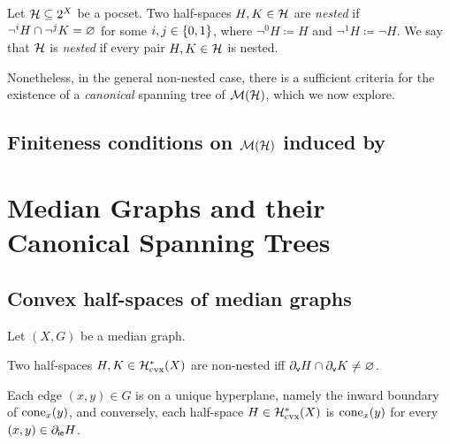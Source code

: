\documentclass{amsart}
\begin{document}
    \begin{definition}\label{def:nested}
        Let $\mc{H}\subseteq2^X$ be a pocset. Two half-spaces $H,K\in\mc{H}$ are \textit{nested} if $\lnot^iH\cap\lnot^jK=\em$ for some $i,j\in\l\{0,1\r\}$, where $\lnot^0H\coloneqq H$ and $\lnot^1H\coloneqq\lnot H$. We say that $\mc{H}$ is \textit{nested} if every pair $H,K\in\mc{H}$ is nested.
    \end{definition}

    Nonetheless, in the general non-nested case, there is a sufficient criteria for the existence of a \textit{canonical} spanning tree of $\mc{M}(\mc{H})$, which we now explore.

    \subsection{Finiteness conditions on $\mc{M}(\mc{H})$ induced by {\color{red}{???}}}\label{sec:finiteness_conditions_on_median_graph_dense_cuts}

    \section{Median Graphs and their Canonical Spanning Trees}\label{sec:spanning_trees_of_median_graphs_with_finite_hyperplanes}

    \subsection{Convex half-spaces of median graphs}

    Let $(X,G)$ be a median graph.

    \begin{lemma}\label{lem:non-nested_iff_boundary_intersect}
        Two half-spaces $H,K\in\mc{H}^\ast_\mathrm{cvx}(X)$ are non-nested iff $\del_\sf{v}H\cap\del_\sf{v}K\neq\em$.
    \end{lemma}

    \begin{lemma}\label{lem:half-spaces_are_cones}
        Each edge $(x,y)\in G$ is on a unique hyperplane, namely the inward boundary of $\cone_x(y)$, and conversely, each half-space $H\in\mc{H}^\ast_\mathrm{cvx}(X)$ is $\cone_x(y)$ for every $(x,y)\in\del_\sf{ie}H$.
    \end{lemma}
\end{document}
